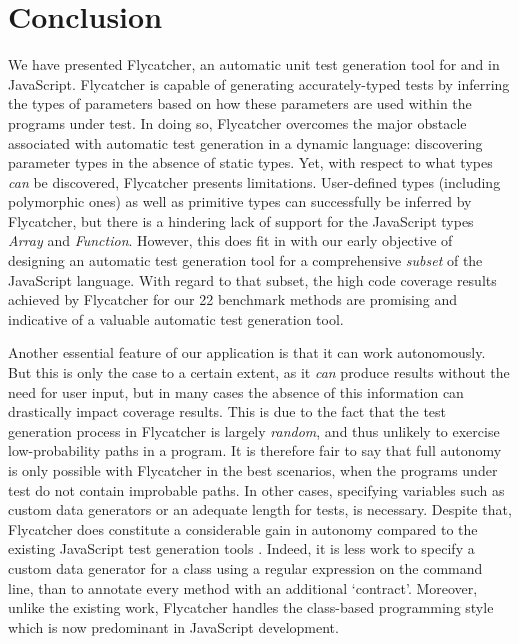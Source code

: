 \chapter{Conclusion}

We have presented \textsf{Flycatcher}, an automatic unit test generation tool for and in JavaScript. \textsf{Flycatcher} is capable of generating accurately-typed tests by inferring the types of parameters based on how these parameters are used within the programs under test. In doing so, \textsf{Flycatcher} overcomes the major obstacle associated with automatic test generation in a dynamic language: discovering parameter types in the absence of static types. Yet, with respect to what types \emph{can} be discovered, \textsf{Flycatcher} presents limitations. User-defined types (including polymorphic ones) as well as primitive types can successfully be inferred by \textsf{Flycatcher}, but there is a hindering lack of support for the JavaScript types \textit{Array} and \textit{Function}. However, this does fit in with our early objective of designing an automatic test generation tool for a comprehensive \emph{subset} of the JavaScript language. With regard to that subset, the high code coverage results achieved by \textsf{Flycatcher} for our 22 benchmark methods are promising and indicative of a valuable automatic test generation tool.

Another essential feature of our application is that it can work autonomously. But this is only the case to a certain extent, as it \emph{can} produce results without the need for user input, but in many cases the absence of this information can drastically impact coverage results. This is due to the fact that the test generation process in \textsf{Flycatcher} is largely \emph{random}, and thus unlikely to exercise low-probability paths in a program. It is therefore fair to say that full autonomy is only possible with \textsf{Flycatcher} in the best scenarios, when the programs under test do not contain improbable paths. In other cases, specifying variables such as custom data generators or an adequate length for tests, is necessary. Despite that, \textsf{Flycatcher} does constitute a considerable gain in autonomy compared to the existing JavaScript test generation tools \cite{saxena2010symbolic, alshraideh2008complete, contract-driven, artzi2011framework}. Indeed, it is less work to specify a custom data generator for a class using a regular expression on the command line, than to annotate every method with an additional `contract'. Moreover, unlike the existing work, \textsf{Flycatcher} handles the class-based programming style which is now predominant in JavaScript development.

